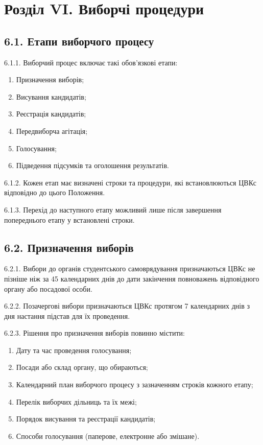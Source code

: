 \section*{Розділ VI. Виборчі процедури}

\subsection*{6.1. Етапи виборчого процесу}
    6.1.1. Виборчий процес включає такі обов'язкові етапи:

        \begin{enumerate}[label=\alph*)]
            \item Призначення виборів;
            \item Висування кандидатів;
            \item Реєстрація кандидатів;
            \item Передвиборча агітація;
            \item Голосування;
            \item Підведення підсумків та оголошення результатів.
        \end{enumerate}

    6.1.2. Кожен етап має визначені строки та процедури, які встановлюються ЦВКс відповідно до цього Положення.

    6.1.3. Перехід до наступного етапу можливий лише після завершення попереднього етапу у встановлені строки.

\subsection*{6.2. Призначення виборів}
    6.2.1. Вибори до органів студентського самоврядування призначаються ЦВКс не пізніше ніж за 45 календарних днів до дати закінчення повноважень відповідного органу або посадової особи.

    6.2.2. Позачергові вибори призначаються ЦВКс протягом 7 календарних днів з дня настання підстав для їх проведення.

    6.2.3. Рішення про призначення виборів повинно містити:

        \begin{enumerate}[label=\alph*)]
            \item Дату та час проведення голосування;
            \item Посади або склад органу, що обираються;
            \item Календарний план виборчого процесу з зазначенням строків кожного етапу;
            \item Перелік виборчих дільниць та їх межі;
            \item Порядок висування та реєстрації кандидатів;
            \item Способи голосування (паперове, електронне або змішане).
        \end{enumerate}

